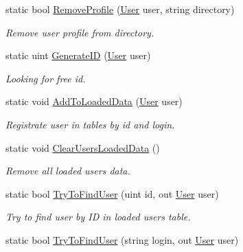 \begin{DoxyCompactItemize}
static bool \mbox{\hyperlink{class_authority_controller_1_1_a_p_i_1_1_local_users_ae02de90abedf4b3e97478dc6270d833d}{Remove\+Profile}} (\mbox{\hyperlink{class_authority_controller_1_1_data_1_1_personal_1_1_user}{User}} user, string directory)
\begin{DoxyCompactList}\small\item\em Remove user profile from directory. \end{DoxyCompactList}\item 
static uint \mbox{\hyperlink{class_authority_controller_1_1_a_p_i_1_1_local_users_aad5081adb0650b6d693e00bf0e833a8a}{Generate\+ID}} (\mbox{\hyperlink{class_authority_controller_1_1_data_1_1_personal_1_1_user}{User}} user)
\begin{DoxyCompactList}\small\item\em Looking for free id. \end{DoxyCompactList}\item 
static void \mbox{\hyperlink{class_authority_controller_1_1_a_p_i_1_1_local_users_a2090f668f0dcc303c254b0bdac6c0701}{Add\+To\+Loaded\+Data}} (\mbox{\hyperlink{class_authority_controller_1_1_data_1_1_personal_1_1_user}{User}} user)
\begin{DoxyCompactList}\small\item\em Registrate user in tables by id and login. \end{DoxyCompactList}\item 
static void \mbox{\hyperlink{class_authority_controller_1_1_a_p_i_1_1_local_users_a38dbb5226a8c8fb138f6ecb590713d75}{Clear\+Users\+Loaded\+Data}} ()
\begin{DoxyCompactList}\small\item\em Remove all loaded users data. \end{DoxyCompactList}\item 
static bool \mbox{\hyperlink{class_authority_controller_1_1_a_p_i_1_1_local_users_a9ce59e22a9d7f732ea20d2579ab57f48}{Try\+To\+Find\+User}} (uint id, out \mbox{\hyperlink{class_authority_controller_1_1_data_1_1_personal_1_1_user}{User}} user)
\begin{DoxyCompactList}\small\item\em Try to find user by ID in loaded users table. \end{DoxyCompactList}\item 
static bool \mbox{\hyperlink{class_authority_controller_1_1_a_p_i_1_1_local_users_af37939b7ade7b7be30f5ad8935cecdb3}{Try\+To\+Find\+User}} (string login, out \mbox{\hyperlink{class_authority_controller_1_1_data_1_1_personal_1_1_user}{User}} user)

\end{DoxyCompactItemize}
